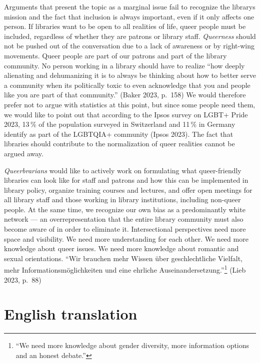 \documentclass[a4paper,
fontsize=11pt,
oneside,
numbers=noperiodatend,
parskip=half-,
bibliography=totoc,
final
]{scrartcl}
\begin{document}
Arguments that present the topic as a marginal issue fail to recognize
the library\textquotesingle s mission and the fact that inclusion is
always important, even if it only affects one person. If libraries want
to be open to all realities of life, queer people must be included,
regardless of whether they are patrons or library staff.
\emph{Queerness} should not be pushed out of the conversation due to a
lack of awareness or by right-wing movements. Queer people are part of
our patrons and part of the library community. No person working in a
library should have to realize \enquote{how deeply alienating and dehumanizing
it is to always be thinking about how to better serve a community when
it\textquotesingle s politically toxic to even acknowledge that you and
people like you are part of that community.} (Baker 2023, p.~158) We
would therefore prefer not to argue with statistics at this point, but
since some people need them, we would like to point out that according
to the Ipsos survey on LGBT+ Pride 2023, 13\,\% of the population surveyed
in Switzerland and 11\,\% in Germany identify as part of the LGBTQIA+
community (Ipsos 2023). The fact that libraries should contribute to the
normalization of queer realities cannot be argued away.

\emph{Queerbrarians} would like to actively work on formulating what
queer-friendly libraries can look like for staff and patrons and how
this can be implemented in library policy, organize training courses and
lectures, and offer open meetings for all library staff and those
working in library institutions, including non-queer people. At the same
time, we recognize our own bias as a predominantly white network --- an
overrepresentation that the entire library community must also become
aware of in order to eliminate it. Intersectional perspectives need more
space and visibility. We need more understanding for each other. We need
more knowledge about queer issues. We need more knowledge about romantic
and sexual orientations. \enquote{Wir brauchen mehr Wissen über geschlechtliche
Vielfalt, mehr Informationsmöglichkeiten und eine ehrliche
Auseinandersetzung.}\footnote{\enquote{We need more knowledge about gender
  diversity, more information options and an honest debate.}} (Lieb
2023, p.~88)

\hypertarget{english-translation}{%
\section{English translation}\label{english-translation}}
\end{document}
